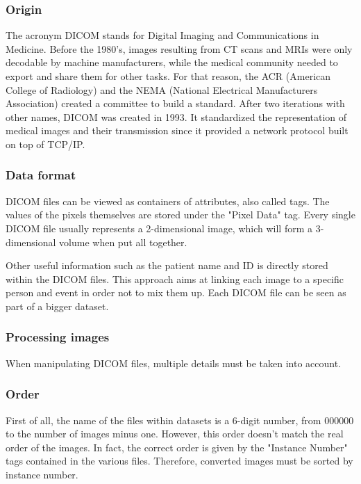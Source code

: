 \subsubsection{Origin}

The acronym DICOM stands for Digital Imaging and Communications in Medicine. Before the 1980’s, images resulting from CT scans and MRIs were only decodable by machine manufacturers, while the medical community needed to export and share them for other tasks. For that reason, the ACR (American College of Radiology) and the NEMA (National Electrical Manufacturers Association) created a committee to build a standard. After two iterations with other names, DICOM was created in 1993. It standardized the representation of medical images and their transmission since it provided a network protocol built on top of TCP/IP.


\subsubsection{Data format}

DICOM files can be viewed as containers of attributes, also called tags. The values of the pixels themselves are stored under the "Pixel Data" tag. Every single DICOM file usually represents a 2-dimensional image, which will form a 3-dimensional volume when put all together. 

Other useful information such as the patient name and ID is directly stored within the DICOM files. This approach aims at linking each image to a specific person and event in order not to mix them up. Each DICOM file can be seen as part of a bigger dataset. 


\subsubsection{Processing images}

When manipulating DICOM files, multiple details must be taken into account. 

\subsubsection{Order}
First of all, the name of the files within datasets is a 6-digit number, from 000000 to the number of images minus one. However, this order doesn’t match the real order of the images. In fact, the correct order is given by the "Instance Number" tags contained in the various files. Therefore, converted images must be sorted by instance number. 


